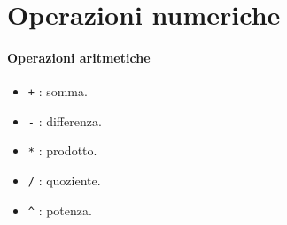 \section{Operazioni numeriche}

\paragraph{Operazioni aritmetiche}
\begin{itemize}

	\item	\texttt{+} : somma.
	
	\item	\texttt{-} : differenza.
	
	\item	\texttt{*} : prodotto.
	
	\item	\texttt{/} : quoziente.
	
	\item	\texttt{\^} : potenza.
	
\end{itemize}	
	
	
